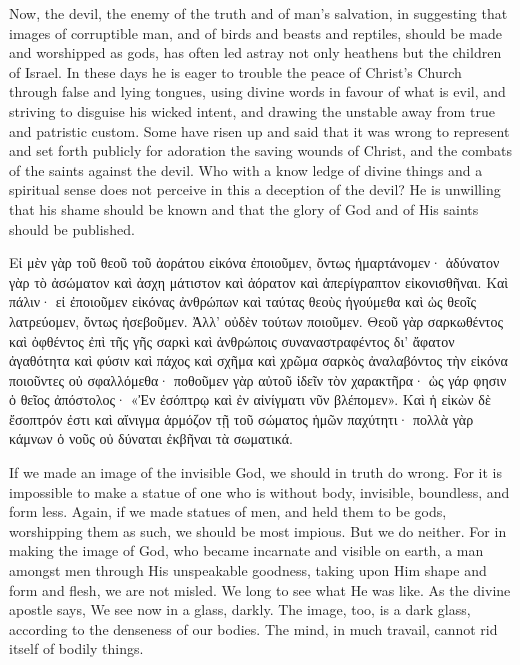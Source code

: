\documentclass[10pt]{book}
\newcommand{\switchGreek}[1][]{\selectlanguage{polutonikogreek} \switchcolumn*[#1]}
\newcommand{\switchEnglish}{\selectlanguage{english} \switchcolumn}
\begin{document}
\begin{paracol}{2}
Now, the devil, the enemy of the 
truth and of man's salvation, in suggesting 
that images of corruptible man, and of birds 
and beasts and reptiles, should be made and 
worshipped as gods, has often led astray not 
only heathens but the children of Israel. In 
these days he is eager to trouble the peace 
of Christ's Church through false and lying 
tongues, using divine words in favour of what 
is evil, and striving to disguise his wicked 
intent, and drawing the unstable away from 
true and patristic custom. Some have risen 
up and said that it was wrong to represent 
and set forth publicly for adoration the saving 
wounds of Christ, and the combats of the 
saints against the devil. Who with a know 
ledge of divine things and a spiritual sense 
does not perceive in this a deception of the 
devil? He is unwilling that his shame 
should be known and that the glory of God 
and of His saints should be published.

\switchGreek

Εἰ μὲν γὰρ τοῦ θεοῦ τοῦ ἀοράτου εἰκόνα ἐποιοῦμεν, ὄντως ἡμαρτάνομεν· ἀδύνατον
γὰρ τὸ ἀσώματον καὶ ἀσχη μάτιστον καὶ ἀόρατον καὶ ἀπερίγραπτον εἰκονισθῆναι.
Καὶ πάλιν· εἰ ἐποιοῦμεν εἰκόνας ἀνθρώπων καὶ ταύτας θεοὺς ἡγούμεθα καὶ ὡς
θεοῖς λατρεύομεν, ὄντως ἠσεβοῦμεν. Ἀλλ’ οὐδὲν τούτων ποιοῦμεν. Θεοῦ γὰρ
σαρκωθέντος καὶ ὀφθέντος ἐπὶ τῆς γῆς σαρκὶ καὶ ἀνθρώποις συναναστραφέντος δι’
ἄφατον ἀγαθότητα καὶ φύσιν καὶ πάχος καὶ σχῆμα καὶ χρῶμα σαρκὸς ἀναλαβόντος
τὴν εἰκόνα ποιοῦντες οὐ σφαλλόμεθα· ποθοῦμεν γὰρ αὐτοῦ ἰδεῖν τὸν χαρακτῆρα·
ὡς γάρ φησιν ὁ θεῖος ἀπόστολος· «Ἐν ἐσόπτρῳ καὶ ἐν αἰνίγματι νῦν βλέπομεν».
Καὶ ἡ εἰκὼν δὲ ἔσοπτρόν ἐστι καὶ αἴνιγμα ἁρμόζον τῇ τοῦ σώματος ἡμῶν
παχύτητι· πολλὰ γὰρ κάμνων ὁ νοῦς οὐ δύναται ἐκβῆναι τὰ σωματικά.

\switchEnglish

If we made an image of the invisible God, 
we should in truth do wrong. For it is 
impossible to make a statue of one who is 
without body, invisible, boundless, and form 
less. Again, if we made statues of men, and 
held them to be gods, worshipping them as 
such, we should be most impious. But we 
do neither. For in making the image of God, 
who became incarnate and visible on earth, 
a man amongst men through His unspeakable 
goodness, taking upon Him shape and form 
and flesh, we are not misled. We long to see 
what He was like. As the divine apostle 
says, We see now in a glass, darkly. The 
image, too, is a dark glass, according to the 
denseness of our bodies. The mind, in much 
travail, cannot rid itself of bodily things. 


\end{paracol}
\end{document}
